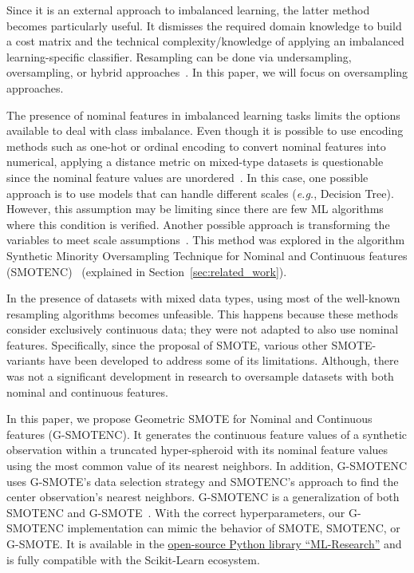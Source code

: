 \documentclass[preprint,12pt]{elsarticle}
\begin{document}
{Since it is an external approach to imbalanced learning, the latter method
becomes particularly useful. It dismisses the required domain knowledge to
build a cost matrix and the technical complexity/knowledge of applying an
imbalanced learning-specific classifier. Resampling can be done via
undersampling, oversampling, or hybrid approaches~\cite{tarekegn2021review}. In
this paper, we will focus on oversampling approaches.

The presence of nominal features in imbalanced learning tasks limits the
options available to deal with class imbalance. Even though it is possible to
use encoding methods such as one-hot or ordinal encoding to convert nominal
features into numerical, applying a distance metric on mixed-type datasets is
questionable since the nominal feature values are
unordered~\cite{lumijarvi2004comparison}. In this case, one possible approach
is to use models that can handle different scales (\textit{e.g.}, Decision
Tree). However, this assumption may be limiting since there are few ML
algorithms where this condition is verified. Another possible approach is
transforming the variables to meet scale
assumptions~\cite{lumijarvi2004comparison}. This method was explored in the
algorithm Synthetic Minority Oversampling Technique for Nominal and Continuous
features (SMOTENC)~\cite{Chawla2002} (explained in
Section~\ref{sec:related_work}).

In the presence of datasets with mixed data types, using most of the
well-known resampling algorithms becomes unfeasible. This happens because
these methods consider exclusively continuous data; they were not adapted to
also use nominal features. Specifically, since the proposal of SMOTE, various
other SMOTE-variants have been developed to address some of its limitations.
Although, there was not a significant development in research to oversample
datasets with both nominal and continuous features. 

In this paper, we propose Geometric SMOTE for Nominal and Continuous features
(G-SMOTENC). It generates the continuous feature values of a synthetic
observation within a truncated hyper-spheroid with its nominal feature values using
the most common value of its nearest neighbors. In addition, G-SMOTENC uses
G-SMOTE's data selection strategy and SMOTENC's approach to find the
center observation's nearest neighbors. G-SMOTENC is a generalization of both
SMOTENC and G-SMOTE~\cite{douzas2019geometric}. With the correct
hyperparameters, our G-SMOTENC implementation can mimic the behavior of SMOTE,
SMOTENC, or G-SMOTE\@. It is available in the
\href{https://github.com/joaopfonseca/ml-research}{open-source Python library
``ML-Research''} and is fully compatible with the Scikit-Learn ecosystem.

}
\end{document}
